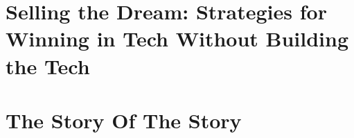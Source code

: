 \part{Selling the Dream: Strategies for Winning in Tech Without Building the Tech}


%
%
%
%

%
%
%
%
%
%
%
%
%



%
%
%
%
%
%
%
%
%
%
%
%

\part{The Story Of The Story}

